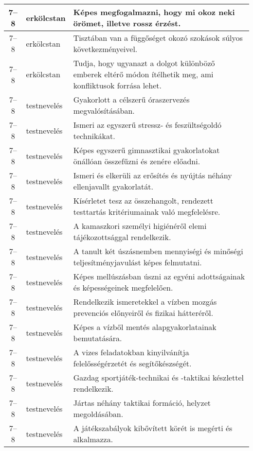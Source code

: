 \begin{small}
\begin{longtable}{c | p{2cm} |  p{11cm} }
              7--8 & erkölcstan & Képes megfogalmazni, hogy mi okoz neki örömet, illetve rossz érzést. \\ \hline
              7--8 & erkölcstan & Tisztában van a függőséget okozó szokások súlyos következményei\-vel. \\ \hline
              7--8 & erkölcstan & Tudja, hogy ugyanazt a dolgot különböző emberek eltérő módon ítélhetik meg, ami konfliktusok forrása lehet. \\ \hline
              7--8 & testnevelés & Gyakorlott a célszerű óraszervezés megvalósításában. \\ \hline
              7--8 & testnevelés & Ismeri az egyszerű stressz- és feszültségoldó technikákat. \\ \hline
              7--8 & testnevelés & Képes egyszerű gimnasztikai gyakorlatokat önállóan összefűzni és zenére előadni. \\ \hline
              7--8 & testnevelés & Ismeri és elkerüli az erősítés és nyújtás néhány ellenjavallt gyakorlatát. \\ \hline
              7--8 & testnevelés & Kísérletet tesz az összehangolt, rendezett testtartás kritériumainak való megfelelésre. \\ \hline
              7--8 & testnevelés & A kamaszkori személyi higiénéről elemi tájékozottsággal rendelkezik. \\ \hline
              7--8 & testnevelés & A tanult két úszásnemben mennyiségi és minőségi teljesítményjavulást képes felmutatni. \\ \hline
              7--8 & testnevelés & Képes mellúszásban úszni az egyéni adottságainak és képességeinek megfelelően. \\ \hline
              7--8 & testnevelés & Rendelkezik ismeretekkel a vízben mozgás prevenciós előnyeiről és fizikai hátteréről. \\ \hline
              7--8 & testnevelés & Képes a vízből mentés alapgyakorlatainak bemutatására. \\ \hline
              7--8 & testnevelés & A vizes feladatokban kinyilvánítja felelősségérzetét és segítőkészségét. \\ \hline
              7--8 & testnevelés & Gazdag sportjáték-technikai és -taktikai készlettel rendelkezik. \\ \hline
              7--8 & testnevelés & Jártas néhány taktikai formáció, helyzet megoldásában. \\ \hline
              7--8 & testnevelés & A játékszabályok kibővített körét is megérti és alkalmazza. \\ \hline

\end{longtable}
\end{small}
